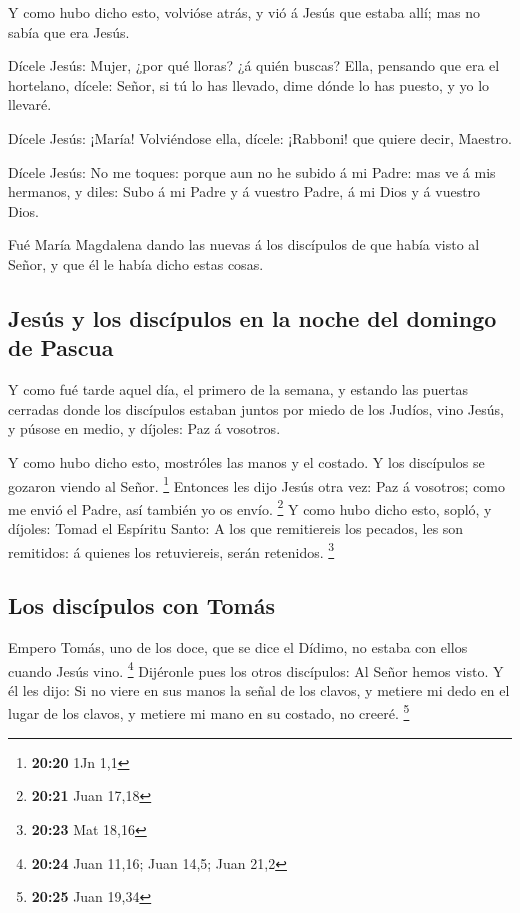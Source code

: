  Y como hubo dicho esto, volvióse atrás, y vió á Jesús que
estaba allí; mas no sabía que era Jesús.

 Dícele Jesús: Mujer, ¿por qué lloras? ¿á quién buscas?
Ella, pensando que era el hortelano, dícele: Señor, si tú lo has
llevado, dime dónde lo has puesto, y yo lo llevaré.

 Dícele Jesús: ¡María! Volviéndose ella, dícele: ¡Rabboni!
que quiere decir, Maestro.

 Dícele Jesús: No me toques: porque aun no he subido á mi
Padre: mas ve á mis hermanos, y diles: Subo á mi Padre y á vuestro
Padre, á mi Dios y á vuestro Dios.

 Fué María Magdalena dando las nuevas á los discípulos de
que había visto al Señor, y que él le había dicho estas cosas.

\hypertarget{jesuxfas-y-los-discuxedpulos-en-la-noche-del-domingo-de-pascua}{%
\subsection{Jesús y los discípulos en la noche del domingo de
Pascua}\label{jesuxfas-y-los-discuxedpulos-en-la-noche-del-domingo-de-pascua}}

 Y como fué tarde aquel día, el primero de la semana, y
estando las puertas cerradas donde los discípulos estaban juntos por
miedo de los Judíos, vino Jesús, y púsose en medio, y díjoles: Paz á
vosotros.

 Y como hubo dicho esto, mostróles las manos y el costado.
Y los discípulos se gozaron viendo al Señor. \footnote{\textbf{20:20}
  1Jn 1,1}  Entonces les dijo Jesús otra vez: Paz á
vosotros; como me envió el Padre, así también yo os envío. \footnote{\textbf{20:21}
  Juan 17,18}  Y como hubo dicho esto, sopló, y díjoles:
Tomad el Espíritu Santo:  A los que remitiereis los
pecados, les son remitidos: á quienes los retuviereis, serán retenidos.
\footnote{\textbf{20:23} Mat 18,16}

\hypertarget{los-discuxedpulos-con-tomuxe1s}{%
\subsection{Los discípulos con
Tomás}\label{los-discuxedpulos-con-tomuxe1s}}

 Empero Tomás, uno de los doce, que se dice el Dídimo, no
estaba con ellos cuando Jesús vino. \footnote{\textbf{20:24} Juan 11,16;
  Juan 14,5; Juan 21,2}  Dijéronle pues los otros
discípulos: Al Señor hemos visto. Y él les dijo: Si no viere en sus
manos la señal de los clavos, y metiere mi dedo en el lugar de los
clavos, y metiere mi mano en su costado, no creeré. \footnote{\textbf{20:25}
  Juan 19,34}


